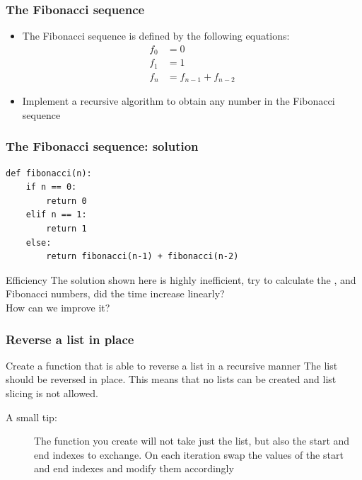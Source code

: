 \documentclass[11pt]{beamer}
\begin{document}
\begin{frame}\frametitle{The Fibonacci sequence}
\begin{itemize}
\item The Fibonacci sequence is defined by the following equations:
\begin{equation*}
\begin{aligned}
f_0 &= 0\\
f_1 &= 1\\
f_n &= f_{n-1} + f_{n-2}
\end{aligned}
\end{equation*}
\item Implement a recursive algorithm to obtain any number in the Fibonacci sequence
\end{itemize}
\end{frame}

\begin{frame}[fragile]\frametitle{The Fibonacci sequence: solution}
\begin{lstlisting}
def fibonacci(n):
	if n == 0:
		return 0
	elif n == 1:
		return 1
	else:
		return fibonacci(n-1) + fibonacci(n-2)
\end{lstlisting}
\begin{block}{Efficiency}
The solution shown here is highly inefficient, try to calculate the ,  and  Fibonacci numbers, did the time increase linearly?\\
How can we improve it?
\end{block}
\end{frame}

\begin{frame}\frametitle{Reverse a list in place}
\begin{block}{Create a function that is able to reverse a list in a recursive manner}
The list should be reversed in place. This means that no lists can be created and list slicing is not allowed.
\end{block}
\begin{description}
\item[A small tip:] The function you create will not take just the list, but also the start and end indexes to exchange. On each iteration swap the values of the start and end indexes and modify them accordingly
\end{description}
\end{frame}


\end{document}
